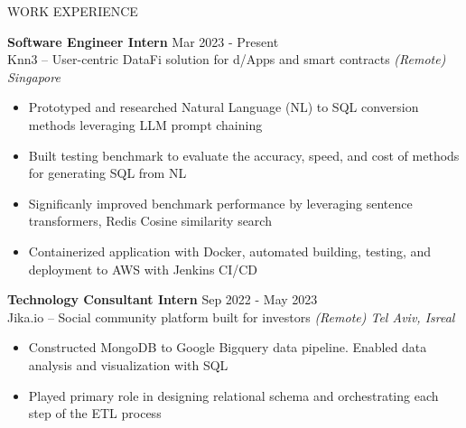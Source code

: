 \documentclass{cv} %
\begin{document}
\begin{rSection}{WORK EXPERIENCE}

	\textbf{Software Engineer Intern} \hfill Mar 2023 - Present\\
	Knn3 – User-centric DataFi solution for d/Apps and smart contracts  \hfill \textit{(Remote) Singapore}
	\begin{itemize}
		\item Prototyped and researched Natural Language (NL) to SQL conversion methods leveraging LLM prompt chaining
		\item Built testing benchmark to evaluate the accuracy, speed, and cost of methods for generating SQL from NL
		\item Significanly improved benchmark performance by leveraging sentence transformers, Redis Cosine similarity search
		\item Containerized application with Docker, automated building, testing, and deployment to AWS with Jenkins CI/CD
	\end{itemize}

	\textbf{Technology Consultant Intern} \hfill Sep 2022 - May 2023\\
	Jika.io – Social community platform built for investors \hfill \textit{(Remote) Tel Aviv, Isreal}
	\begin{itemize}
		\item Constructed MongoDB to Google Bigquery data pipeline. Enabled data analysis and visualization with SQL
		\item Played primary role in designing relational schema and orchestrating each step of the ETL process
	\end{itemize}
\end{rSection}
\end{document}
